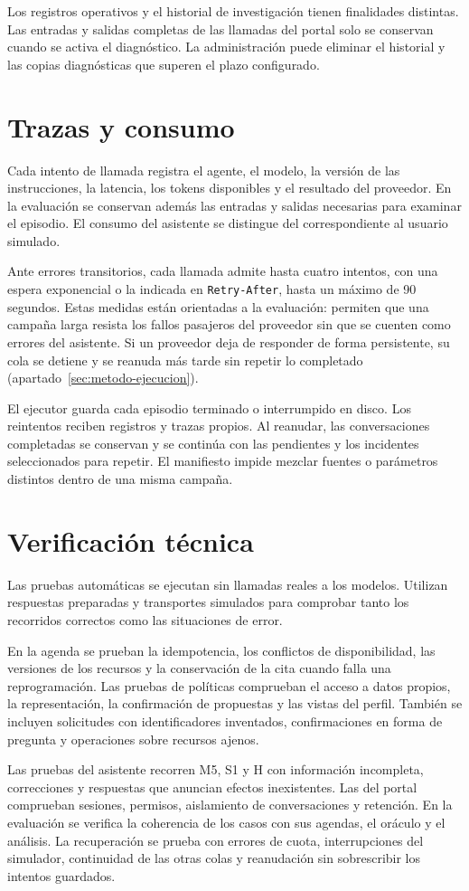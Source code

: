 Los registros operativos y el historial de investigación tienen finalidades
distintas. Las entradas y salidas completas de las llamadas del portal solo se
conservan cuando se activa el diagnóstico. La administración puede eliminar
el historial y las copias diagnósticas que superen el plazo configurado.

\section{Trazas y consumo}

Cada intento de llamada registra el agente, el modelo, la versión de las
instrucciones, la latencia, los tokens disponibles y el resultado del proveedor.
En la evaluación se conservan además las entradas y salidas necesarias para
examinar el episodio. El consumo del asistente se distingue del correspondiente
al usuario simulado.

Ante errores transitorios, cada llamada admite hasta cuatro intentos, con una espera
exponencial o la indicada en \texttt{Retry-After}, hasta un máximo de 90 segundos. Estas medidas están
orientadas a la evaluación: permiten que una campaña larga resista los fallos
pasajeros del proveedor sin que se cuenten como errores del asistente. Si un
proveedor deja de responder de forma persistente, su cola se detiene y se
reanuda más tarde sin repetir lo completado
(apartado~\ref{sec:metodo-ejecucion}).

El ejecutor guarda cada episodio terminado o interrumpido en disco. Los
reintentos reciben registros y trazas propios. Al reanudar, las conversaciones
completadas se conservan y se continúa con las pendientes y los incidentes
seleccionados para repetir. El manifiesto impide mezclar fuentes o parámetros
distintos dentro de una misma campaña.

\section{Verificación técnica}

Las pruebas automáticas se ejecutan sin llamadas reales a los modelos. Utilizan
respuestas preparadas y transportes simulados para comprobar tanto los recorridos
correctos como las situaciones de error.

En la agenda se prueban la idempotencia, los conflictos de disponibilidad,
las versiones de los recursos y la conservación de la cita cuando falla una
reprogramación. Las pruebas de políticas comprueban el acceso a datos propios,
la representación, la confirmación de propuestas y las vistas del perfil.
También se incluyen solicitudes con identificadores inventados, confirmaciones
en forma de pregunta y operaciones sobre recursos ajenos.

Las pruebas del asistente recorren M5, S1 y H con información incompleta,
correcciones y respuestas que anuncian efectos inexistentes. Las del portal
comprueban sesiones, permisos, aislamiento de conversaciones y retención.
En la evaluación se verifica la coherencia de los casos con sus agendas, el
oráculo y el análisis. La recuperación se prueba con errores de cuota,
interrupciones del simulador, continuidad de las otras colas y reanudación sin
sobrescribir los intentos guardados.

